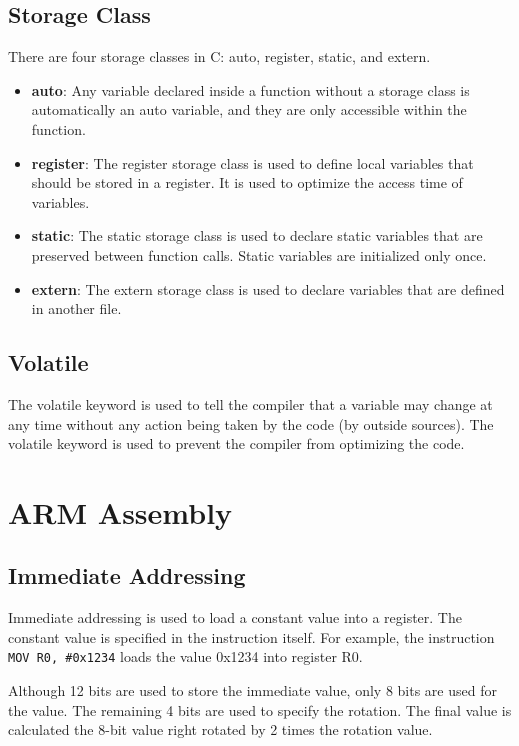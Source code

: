 \documentclass[a4paper,12pt]{article}
\begin{document}
\subsection{Storage Class}

There are four storage classes in C: auto, register, static, and extern.
\begin{itemize}
	\item \textbf{auto}: Any variable declared inside a function without a storage class is automatically an auto variable, and they are only accessible within the function.
	\item \textbf{register}: The register storage class is used to define local variables that should be stored in a register. It is used to optimize the access time of variables.
	\item \textbf{static}: The static storage class is used to declare static variables that are preserved between function calls. Static variables are initialized only once.
	\item \textbf{extern}: The extern storage class is used to declare variables that are defined in another file.
\end{itemize}

\subsection{Volatile}

The volatile keyword is used to tell the compiler that a variable may change at any time without any action being taken by the code (by outside sources). The volatile keyword is used to prevent the compiler from optimizing the code.

\section{ARM Assembly}

\subsection{Immediate Addressing}

Immediate addressing is used to load a constant value into a register. The constant value is specified in the instruction itself. For example, the instruction \texttt{MOV R0, \#0x1234} loads the value 0x1234 into register R0.

Although 12 bits are used to store the immediate value, only 8 bits are used for the value. The remaining 4 bits are used to specify the rotation. The final value is calculated the 8-bit value right rotated by 2 times the rotation value.
\end{document}
